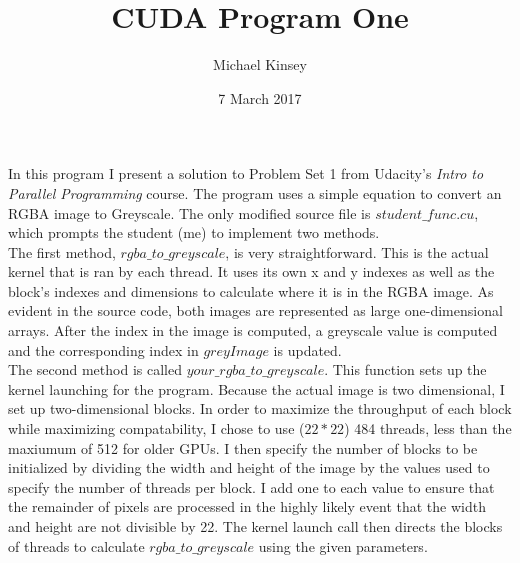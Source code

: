 \documentclass{article}
\begin{document}
\title{CUDA Program One}
\author{Michael Kinsey}
\date{7 March 2017}
\maketitle

In this program I present a solution to Problem Set 1 from Udacity's \textit{Intro
to Parallel Programming} course. The program uses a simple equation to convert an
RGBA image to Greyscale. The only modified source file is $student\_func.cu$,
which prompts the student (me) to implement two methods. \\

The first method, $rgba\_to\_greyscale$, is very straightforward. This is the actual
kernel that is ran by each thread. It uses its own x and y indexes as well as the
block's indexes and dimensions to calculate where it is in the RGBA image. As
evident in the source code, both images are represented as large one-dimensional
arrays. After the index in the image is computed, a greyscale value is computed
and the corresponding index in $greyImage$ is updated.\\

The second method is called $your\_rgba\_to\_greyscale$. This function sets up the
kernel launching for the program. Because the actual image is two dimensional, I
set up two-dimensional blocks. In order to maximize the throughput of each block
while maximizing compatability, I chose to use ($22 * 22 $) 484 threads, less
than the maxiumum of 512 for older GPUs. I then specify the number of blocks to
be initialized by dividing the width and height of the image by the values used
to specify the number of threads per block. I add one to each value to ensure
that the remainder of pixels are processed in the highly likely event that the
width and height are not divisible by 22. The kernel launch call then directs
the blocks of threads to calculate $rgba\_to\_greyscale$ using the given parameters. 
\end{document}
